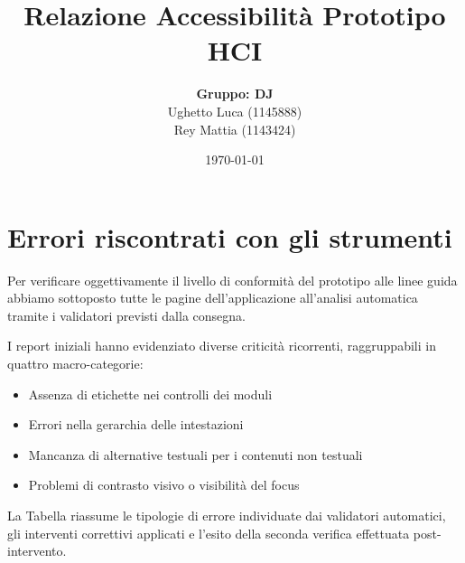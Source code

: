 \documentclass[11pt, a4paper]{article}
\title{\textbf{Relazione Accessibilità Prototipo HCI}}
\author{
    \textbf{Gruppo: DJ} \\
    Ughetto Luca (1145888) \\
    Rey Mattia (1143424) \\
}
\date{\today}
\begin{document}
    \maketitle
    \newpage

    \section{Errori riscontrati con gli strumenti}

    Per verificare oggettivamente il livello di conformità del prototipo alle linee guida abbiamo sottoposto tutte le pagine dell'applicazione all'analisi automatica tramite i validatori previsti dalla consegna.

\noindent I report iniziali hanno evidenziato diverse criticità ricorrenti, raggruppabili in quattro macro-categorie:
\begin{itemize}
    \item Assenza di etichette nei controlli dei moduli
    \item Errori nella gerarchia delle intestazioni
    \item Mancanza di alternative testuali per i contenuti non testuali
    \item Problemi di contrasto visivo o visibilità del focus
\end{itemize}
\noindent La Tabella riassume le tipologie di errore individuate dai validatori automatici, gli interventi correttivi applicati e l'esito della seconda verifica effettuata post-intervento.
\end{document}
